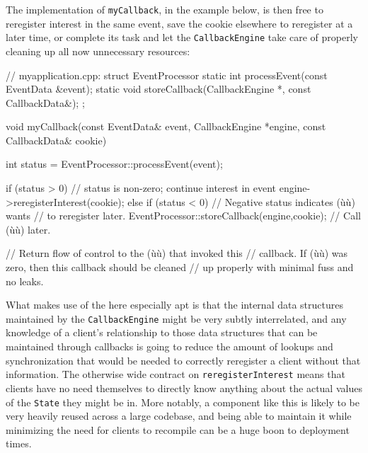 \noindent The implementation of \lstinline!myCallback!, in the example below, is then
free to reregister interest in the same event, save the cookie elsewhere
to reregister at a later time, or complete its task and let the
\lstinline!CallbackEngine! take care of properly cleaning up all now
unnecessary resources:

\begin{emcppshiddenlisting}[emcppsbatch=e6]
// myapplication.cpp:
struct EventProcessor {
    static int processEvent(const EventData &event);
    static void storeCallback(CallbackEngine *, const CallbackData&);    
};
\end{emcppshiddenlisting}
\begin{emcppslisting}[emcppsbatch=e6,emcppsoutputfile=myapplication.cpp]
void myCallback(const EventData&     event,
                CallbackEngine      *engine,
                const CallbackData&  cookie)
{
    int status = EventProcessor::processEvent(event);

    if (status > 0)  // status is non-zero; continue interest in event
    {
        engine->reregisterInterest(cookie);
    }
    else if (status < 0)  // Negative status indicates (ù{}ù) wants
                          // to reregister later.
    {
        EventProcessor::storeCallback(engine,cookie);
                          // Call (ù{}ù) later.
    }

    // Return flow of control to the (ù{}ù) that invoked this
    // callback.  If (ù{}ù) was zero, then this callback should be cleaned
    // up properly with minimal fuss and no leaks.
}
\end{emcppslisting}

\noindent What makes use of the  here especially apt is
that the internal data structures maintained by the
\lstinline!CallbackEngine! might be very subtly interrelated, and any
knowledge of a client's relationship to those data structures that can
be maintained through callbacks is going to reduce the amount of lookups
and synchronization that would be needed to correctly reregister a
client without that information. The otherwise wide contract on
\lstinline!reregisterInterest! means that clients have no need themselves
to directly know anything about the actual values of the \lstinline!State!
they might be in. More notably, a component like this is likely to be
very heavily reused across a large codebase, and being able to maintain
it while minimizing the need for clients to recompile can be a huge boon
to deployment times.

